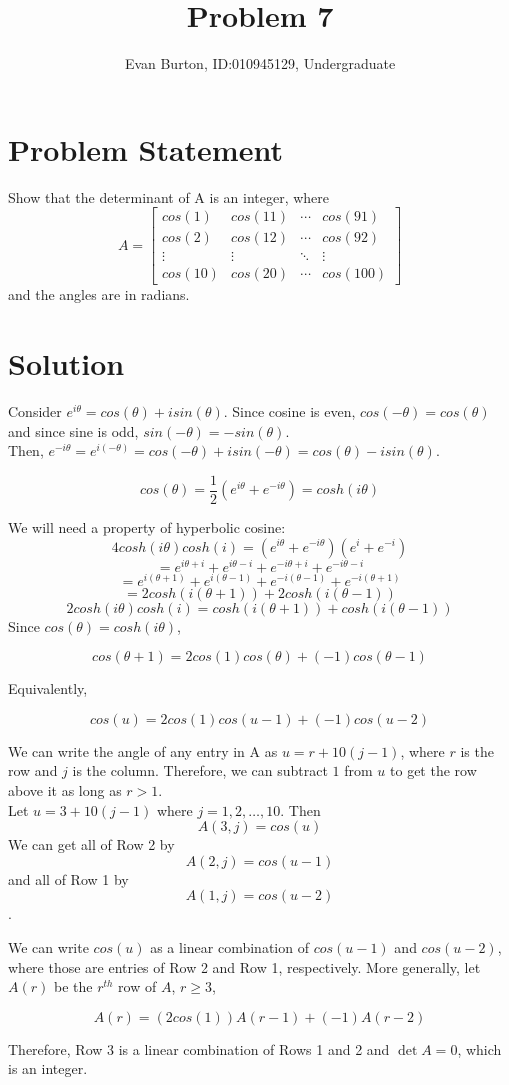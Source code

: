 \documentclass[]{article}
\title{Problem 7}
\author{Evan Burton, ID:010945129, Undergraduate}
\begin{document}
\maketitle

\section{Problem Statement}
Show that the determinant of A is an integer, where \\

$$ A = \left[
\begin{matrix}
cos(1) & cos(11) & \cdots & cos(91) \\ 
cos (2) & cos (12) & \cdots & cos (92) \\ 
\vdots & \vdots  & \ddots & \vdots \\ 
cos (10) & cos (20) & \cdots & cos (100)
\end{matrix}\right]
$$
 and the angles are in radians.
\section{Solution}
Consider $e^{i\theta} = cos(\theta) + i sin(\theta)$. Since cosine is even, $cos(-\theta) = cos(\theta)$ and since sine is odd, $sin(-\theta) = -sin(\theta)$. \\

Then, $e^{-i \theta} = e^{i(-\theta)} = cos(-\theta) + i sin(-\theta) = cos(\theta) - i sin(\theta)$.

$$cos(\theta) = \frac{1}{2}(e^{i\theta} + e^{-i\theta}) = cosh(i\theta)$$



We will need a property of hyperbolic cosine:
$$4 cosh(i\theta)cosh(i) = (e^{i\theta} + e^{-i\theta})(e^i + e^{-i})$$
$$= e^{i\theta + i} + e^{i\theta - i} + e^{-i\theta + i} + e^{-i\theta - i}$$
$$= e^{i(\theta + 1)} + e^{i(\theta - 1)} + e^{-i(\theta - 1)} + e^{-i(\theta+1)}$$
$$= 2 cosh(i(\theta + 1)) + 2 cosh(i(\theta - 1))$$
$$ 2 cosh(i\theta)cosh(i) = cosh(i(\theta + 1)) + cosh(i(\theta - 1))$$
Since $cos(\theta) = cosh(i\theta)$,

$$cos(\theta + 1) = 2 cos(1) cos(\theta) + (-1) cos(\theta - 1)$$
\pagebreak

Equivalently,

$$cos(u) = 2 cos(1) cos(u-1) + (-1) cos(u - 2)$$

We can write the angle of any entry in A as $u = r + 10(j-1)$, where $r$ is the row and $j$ is the column. Therefore, we can subtract $1$ from $u$ to get the row above it as long as $r > 1$.\\

Let $u = 3 + 10(j-1)$ where $j = 1, 2, \dots, 10$. Then $$A(3, j) = cos(u)$$ We can get all of Row 2 by $$A(2, j) = cos(u-1)$$ and all of Row 1 by $$A(1, j) = cos(u-2)$$. 

We can write $cos(u)$ as a linear combination of $cos(u-1)$ and $cos(u-2)$, where those are entries of Row 2 and Row 1, respectively. More generally, let $A(r)$ be the $r^{th}$ row of $A$, $r \geq 3$, 

$$A(r) = (2cos(1))A(r-1) + (-1)A(r-2)$$

Therefore, Row 3 is a linear combination of Rows 1 and 2 and $\det A = 0$, which is an integer.
\end{document}
